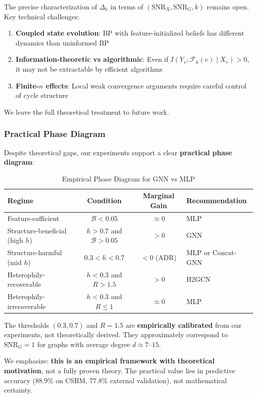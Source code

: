 \begin{remark}
\label{rem:open_problem}
The precise characterization of $\Delta_k$ in terms of $(\mathrm{SNR}_X, \mathrm{SNR}_G, k)$ remains open. Key technical challenges:
\begin{enumerate}
    \item \textbf{Coupled state evolution}: BP with feature-initialized beliefs has different dynamics than uninformed BP
    \item \textbf{Information-theoretic vs algorithmic}: Even if $I(Y_v; \mathcal{F}_k(v) \mid X_v) > 0$, it may not be extractable by efficient algorithms
    \item \textbf{Finite-$n$ effects}: Local weak convergence arguments require careful control of cycle structure
\end{enumerate}
We leave the full theoretical treatment to future work.
\end{remark}

\subsubsection{Practical Phase Diagram}

Despite theoretical gaps, our experiments support a clear \textbf{practical phase diagram}:

\begin{table}[t]
\centering
\caption{Empirical Phase Diagram for GNN vs MLP}
\label{tab:empirical_phase}
\begin{tabular}{@{}lccl@{}}
\toprule
\textbf{Regime} & \textbf{Condition} & \textbf{Marginal Gain} & \textbf{Recommendation} \\
\midrule
Feature-sufficient & $\mathcal{B} < 0.05$ & $\approx 0$ & MLP \\
Structure-beneficial (high $h$) & $h > 0.7$ and $\mathcal{B} > 0.05$ & $> 0$ & GNN \\
Structure-harmful (mid $h$) & $0.3 < h < 0.7$ & $< 0$ (ADR) & MLP or Concat-GNN \\
Heterophily-recoverable & $h < 0.3$ and $R > 1.5$ & $> 0$ & H2GCN \\
Heterophily-irrecoverable & $h < 0.3$ and $R \leq 1$ & $\approx 0$ & MLP \\
\bottomrule
\end{tabular}
\end{table}

\begin{remark}
The thresholds $(0.3, 0.7)$ and $R = 1.5$ are \textbf{empirically calibrated} from our experiments, not theoretically derived. They approximately correspond to $\mathrm{SNR}_G = 1$ for graphs with average degree $d \approx 7$--$15$.

We emphasize: \textbf{this is an empirical framework with theoretical motivation}, not a fully proven theory. The practical value lies in predictive accuracy (88.9\% on CSBM, 77.8\% external validation), not mathematical certainty.
\end{remark}

